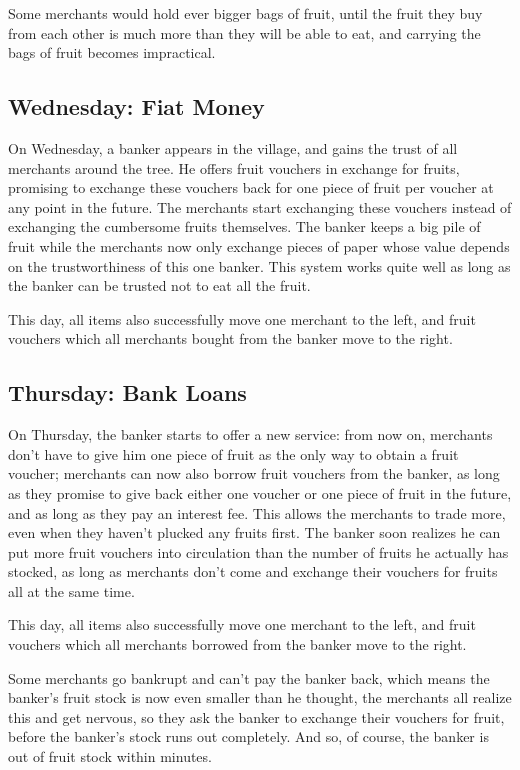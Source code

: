 \documentclass[11pt,twoside,a4paper]{article}
\begin{document}
Some merchants would hold ever bigger bags of fruit, until the fruit they buy from each other is much more than they will be able to eat, and carrying the bags of fruit becomes impractical.

\subsection{Wednesday: Fiat Money}
On Wednesday, a banker appears in the village, and gains the trust of all merchants around the tree. He offers fruit vouchers in exchange for fruits, promising to exchange these vouchers back for one piece of fruit per voucher at any point in the future. The merchants start exchanging these vouchers instead of exchanging the cumbersome fruits themselves. The banker keeps a big pile of fruit while the merchants now only exchange pieces of paper whose value depends on the trustworthiness of this one banker. This system works quite well as long as the banker can be trusted not to eat all the fruit.

This day, all items also successfully move one merchant to the left, and fruit vouchers which all merchants bought from the banker move to the right.

\subsection{Thursday: Bank Loans}
On Thursday, the banker starts to offer a new service: from now on, merchants don't have to give him one piece of fruit as the only way to obtain a fruit voucher; merchants can now also borrow fruit vouchers from the banker, as long as they promise to give back either one voucher or one piece of fruit in the future, and as long as they pay an interest fee. This allows the merchants to trade more, even when they haven't plucked any fruits first. The banker soon realizes he can put more fruit vouchers into circulation than the number of fruits he actually has stocked, as long as merchants don't come and exchange their vouchers for fruits all at the same time.

This day, all items also successfully move one merchant to the left, and fruit vouchers which all merchants borrowed from the banker move to the right.

Some merchants go bankrupt and can't pay the banker back, which means the banker's fruit stock is now even smaller than he thought, the merchants all realize this and get nervous, so they ask the banker to exchange their vouchers for fruit, before the banker's stock runs out completely. And so, of course, the banker is out of fruit stock within minutes.
\end{document}
